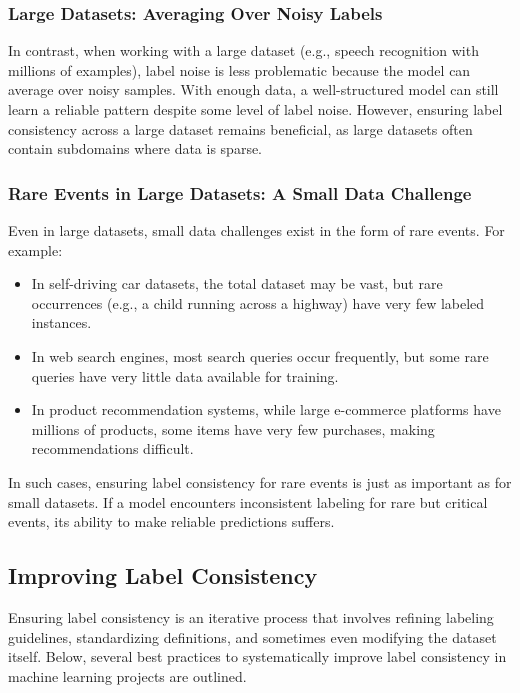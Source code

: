 \documentclass[12pt,openany]{book}
\begin{document}
\subsubsection{Large Datasets: Averaging Over Noisy Labels}
In contrast, when working with a large dataset (e.g., speech recognition with millions of examples), label noise is less problematic because the model can average over noisy samples. With enough data, a well-structured model can still learn a reliable pattern despite some level of label noise. However, ensuring label consistency across a large dataset remains beneficial, as large datasets often contain subdomains where data is sparse.

\subsubsection{Rare Events in Large Datasets: A Small Data Challenge}
Even in large datasets, small data challenges exist in the form of rare events. For example:
\begin{itemize}
    \item In self-driving car datasets, the total dataset may be vast, but rare occurrences (e.g., a child running across a highway) have very few labeled instances.
    \item In web search engines, most search queries occur frequently, but some rare queries have very little data available for training.
    \item In product recommendation systems, while large e-commerce platforms have millions of products, some items have very few purchases, making recommendations difficult.
\end{itemize}

In such cases, ensuring label consistency for rare events is just as important as for small datasets. If a model encounters inconsistent labeling for rare but critical events, its ability to make reliable predictions suffers. \newline


\subsection{Improving Label Consistency}

Ensuring label consistency is an iterative process that involves refining labeling guidelines, standardizing definitions, and sometimes even modifying the dataset itself. Below, several best practices to systematically improve label consistency in machine learning projects are outlined.
\end{document}
